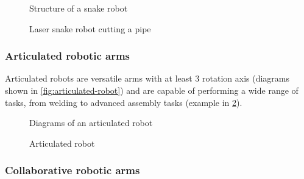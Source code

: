 \begin{figure}[H]
	\begin{floatrow}[2]
		{\caption[Structure of a snake robot]{Structure of a snake robot\protect\footnotemark}\label{fig:snake-arm-robot-diagram}}
		{\caption[Laser snake robot cutting a pipe]{Laser snake robot cutting a pipe\protect\footnotemark}\label{fig:laser-snake-pipe-cutting}}
	\end{floatrow}
\end{figure}


\subsubsection{Articulated robotic arms}

Articulated robots are versatile arms with at least 3 rotation axis (diagrams shown in \cref{fig:articulated-robot}) and are capable of performing a wide range of tasks, from welding to advanced assembly tasks (example in \cref{fig:articulated-robot-kuka}).

\begin{figure}[H]
	\begin{floatrow}[2]
		{\caption[Diagrams of an articulated robot]{Diagrams of an articulated robot\protect\footnotemark}\label{fig:articulated-robot}}
		{\caption[Articulated robot]{Articulated  robot\protect\footnotemark}\label{fig:articulated-robot-kuka}}
	\end{floatrow}
\end{figure}



\subsubsection{Collaborative robotic arms}

